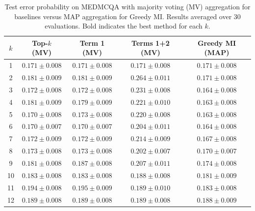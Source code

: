 \documentclass{article}
\theoremstyle{plain}
\theoremstyle{definition}
\theoremstyle{remark}
\begin{document}
\begin{table}[ht]
\centering
\caption{Test error probability on MEDMCQA with majority voting (MV) aggregation for baselines versus MAP aggregation for Greedy MI. Results averaged over 30 evaluations. Bold indicates the best method for each $k$.}
\label{tab:medmcqa_mv_vs_map}
\small
\begin{tabular}{ccccc}
\toprule
$k$ & Top-$k$ (MV) & Term 1 (MV) & Terms 1+2 (MV) & Greedy MI (MAP) \\
\midrule
1  & $0.171 \pm 0.008$ & $0.171 \pm 0.008$ & $0.171 \pm 0.008$ & $0.171 \pm 0.008$ \\
2  & $0.181 \pm 0.009$ & $0.181 \pm 0.009$ & $0.264 \pm 0.011$ & $\mathbf{0.171 \pm 0.008}$ \\
3  & $0.172 \pm 0.008$ & $0.172 \pm 0.008$ & $0.231 \pm 0.008$ & $\mathbf{0.164 \pm 0.008}$ \\
4  & $0.181 \pm 0.009$ & $0.179 \pm 0.009$ & $0.221 \pm 0.010$ & $\mathbf{0.163 \pm 0.008}$ \\
5  & $0.170 \pm 0.008$ & $0.173 \pm 0.008$ & $0.220 \pm 0.008$ & $\mathbf{0.163 \pm 0.008}$ \\
6  & $0.170 \pm 0.007$ & $0.170 \pm 0.007$ & $0.204 \pm 0.011$ & $\mathbf{0.164 \pm 0.008}$ \\
7  & $0.172 \pm 0.009$ & $0.172 \pm 0.009$ & $0.214 \pm 0.009$ & $\mathbf{0.167 \pm 0.008}$ \\
8  & $0.173 \pm 0.008$ & $0.173 \pm 0.008$ & $0.202 \pm 0.007$ & $\mathbf{0.170 \pm 0.007}$ \\
9  & $0.181 \pm 0.008$ & $0.187 \pm 0.008$ & $0.207 \pm 0.011$ & $\mathbf{0.174 \pm 0.008}$ \\
10 & $0.183 \pm 0.008$ & $0.183 \pm 0.008$ & $0.188 \pm 0.008$ & $\mathbf{0.181 \pm 0.009}$ \\
11 & $0.194 \pm 0.008$ & $0.195 \pm 0.009$ & $0.189 \pm 0.010$ & $\mathbf{0.183 \pm 0.008}$ \\
12 & $0.189 \pm 0.008$ & $0.189 \pm 0.008$ & $0.189 \pm 0.008$ & $\mathbf{0.188 \pm 0.009}$ \\
\bottomrule
\end{tabular}
\end{table}
\end{document}
